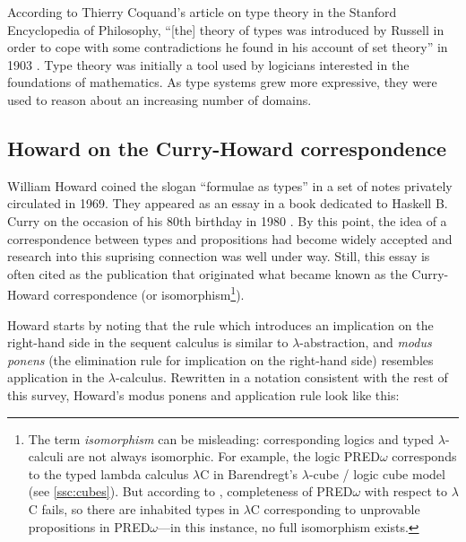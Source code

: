 \documentclass[12pt,toc=bibliography,numbers=noendperiod,
               footnotes=multiple,twoside]{scrartcl}
\begin{document}
According to Thierry Coquand's article on type theory in the Stanford Encyclopedia of Philosophy, \enquote{[the] theory of types was introduced by Russell in order to cope with some contradictions he found in his account of set theory} in 1903 \autocite{coquand_type_2014}. Type theory was initially a tool used by logicians interested in the foundations of mathematics. As type systems grew more expressive, they were used to reason about an increasing number of domains.

\subsection{Howard on the Curry-Howard correspondence}

William Howard coined the slogan \enquote{formulae as types} in a set of notes privately circulated in 1969. They appeared as an essay in a book dedicated to Haskell B. Curry on the occasion of his 80th birthday in 1980 \autocite{howard_formulae-as-types_1980}. By this point, the idea of a correspondence between types and propositions had become widely accepted and research into this suprising connection was well under way. Still, this essay is often cited as the publication that originated what became known as the Curry-Howard correspondence (or isomorphism\footnote{The term \emph{isomorphism} can be misleading: corresponding logics and typed \(\lambda\)-calculi are not always isomorphic. For example, the logic PRED\(\omega\) corresponds to the typed lambda calculus \(\lambda\)C in Barendregt's \(\lambda\)-cube / logic cube model (see \cref{ssc:cubes}). But according to \textcite{barendregt_lambda_1992}, completeness of PRED\(\omega\) with respect to \(\lambda\)C fails, so there are inhabited types in \(\lambda\)C corresponding to unprovable propositions in PRED\(\omega\)---in this instance, no full isomorphism exists.}).

Howard starts by noting that the rule which introduces an implication on the right-hand side in the sequent calculus is similar to \(\lambda\)-abstraction, and \emph{modus ponens} (the elimination rule for implication on the right-hand side) resembles application in the \(\lambda\)-calculus. Rewritten in a notation consistent with the rest of this survey, Howard's modus ponens and application rule look like this:
\end{document}
